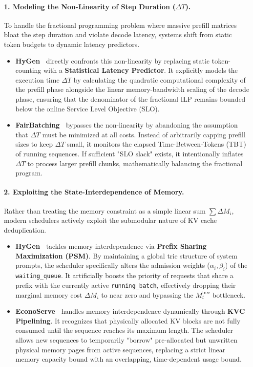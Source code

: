 \documentclass[11pt]{article}
\begin{document}
\paragraph{1. Modeling the Non-Linearity of Step Duration ($\Delta T$).}
To handle the fractional programming problem where massive prefill matrices bloat the step duration and violate decode latency, systems shift from static token budgets to dynamic latency predictors. 
\begin{itemize}
    \item \textbf{HyGen~\citep{sun2025hygen}} directly confronts this non-linearity by replacing static token-counting with a \textbf{Statistical Latency Predictor}. It explicitly models the execution time $\Delta T$ by calculating the quadratic computational complexity of the prefill phase alongside the linear memory-bandwidth scaling of the decode phase, ensuring that the denominator of the fractional ILP remains bounded below the online Service Level Objective (SLO).
    \item \textbf{FairBatching~\citep{lyu2025fairbatching}} bypasses the non-linearity by abandoning the assumption that $\Delta T$ must be minimized at all costs. Instead of arbitrarily capping prefill sizes to keep $\Delta T$ small, it monitors the elapsed Time-Between-Tokens (TBT) of running sequences. If sufficient "SLO slack" exists, it intentionally inflates $\Delta T$ to process larger prefill chunks, mathematically balancing the fractional program.
\end{itemize}

\paragraph{2. Exploiting the State-Interdependence of Memory.}
Rather than treating the memory constraint as a simple linear sum $\sum \Delta M_i$, modern schedulers actively exploit the submodular nature of KV cache deduplication.
\begin{itemize}
    \item \textbf{HyGen~\citep{sun2025hygen}} tackles memory interdependence via \textbf{Prefix Sharing Maximization (PSM)}. By maintaining a global trie structure of system prompts, the scheduler specifically alters the admission weights ($\alpha_i, \beta_i$) of the \texttt{waiting\_queue}. It artificially boosts the priority of requests that share a prefix with the currently active \texttt{running\_batch}, effectively dropping their marginal memory cost $\Delta M_i$ to near zero and bypassing the $M_t^{\mathrm{free}}$ bottleneck.
    \item \textbf{EconoServe~\citep{shen2024econoserve}} handles memory interdependence dynamically through \textbf{KVC Pipelining}. It recognizes that physically allocated KV blocks are not fully consumed until the sequence reaches its maximum length. The scheduler allows new sequences to temporarily "borrow" pre-allocated but unwritten physical memory pages from active sequences, replacing a strict linear memory capacity bound with an overlapping, time-dependent usage bound.
\end{itemize}
\end{document}
